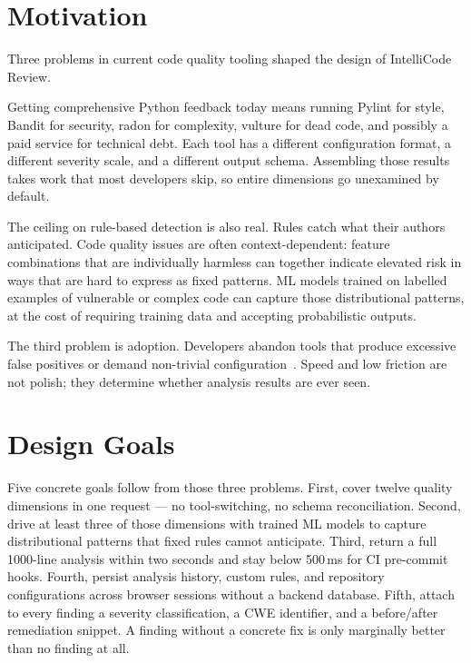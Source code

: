 \documentclass[12pt, oneside]{report}
\begin{document}
\section{Motivation}
\label{sec:motivation}

Three problems in current code quality tooling shaped the design of IntelliCode Review.

Getting comprehensive Python feedback today means running Pylint for style, Bandit for security, radon for complexity, vulture for dead code, and possibly a paid service for technical debt. Each tool has a different configuration format, a different severity scale, and a different output schema. Assembling those results takes work that most developers skip, so entire dimensions go unexamined by default.

The ceiling on rule-based detection is also real. Rules catch what their authors anticipated. Code quality issues are often context-dependent: feature combinations that are individually harmless can together indicate elevated risk in ways that are hard to express as fixed patterns. ML models trained on labelled examples of vulnerable or complex code can capture those distributional patterns, at the cost of requiring training data and accepting probabilistic outputs.

The third problem is adoption. Developers abandon tools that produce excessive false positives or demand non-trivial configuration~\cite{johnson2013, christakis2016}. Speed and low friction are not polish; they determine whether analysis results are ever seen.

\section{Design Goals}
\label{sec:goals}

Five concrete goals follow from those three problems. First, cover twelve quality dimensions in one request — no tool-switching, no schema reconciliation. Second, drive at least three of those dimensions with trained ML models to capture distributional patterns that fixed rules cannot anticipate. Third, return a full 1000-line analysis within two seconds and stay below 500\,ms for CI pre-commit hooks. Fourth, persist analysis history, custom rules, and repository configurations across browser sessions without a backend database. Fifth, attach to every finding a severity classification, a CWE identifier, and a before/after remediation snippet. A finding without a concrete fix is only marginally better than no finding at all.
\end{document}
